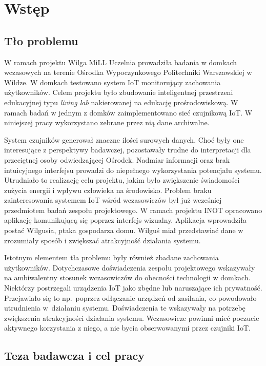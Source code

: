 \newpage
\section{Wstęp}

\subsection{Tło problemu}

W ramach projektu Wilga MiLL Uczelnia prowadziła badania w domkach wczasowych na terenie Ośrodka Wypoczynkowego Politechniki Warszawskiej w Wildze. W domkach testowano system IoT monitorujący zachowania użytkowników. Celem projektu było zbudowanie inteligentnej przestrzeni edukacyjnej typu \textit{living lab} nakierowanej na edukację prośrodowiskową. W ramach badań w jednym z domków zaimplementowano sieć czujnikową IoT. W niniejszej pracy wykorzystano zebrane przez nią dane archiwalne.

System czujników generował znaczne ilości surowych danych. Choć były one interesujące z perspektywy badawczej, pozostawały trudne do interpretacji dla przeciętnej osoby odwiedzającej Ośrodek. Nadmiar informacji oraz brak intuicyjnego interfejsu prowadzi do niepełnego wykorzystania potencjału systemu. Utrudniało to realizację celu projektu, jakim było zwiększenie świadomości zużycia energii i wpływu człowieka na środowisko. Problem braku zainteresowania systemem IoT wśród wczasowiczów był już wcześniej przedmiotem badań zespołu projektowego. W ramach projektu INOT opracowano aplikację komunikującą się poprzez interfejs wizualny. Aplikacja wprowadziła postać Wilgusia, ptaka gospodarza domu. Wilguś miał przedstawiać dane w zrozumiały sposób i zwiększać atrakcyjność działania systemu.

Istotnym elementem tła problemu były również zbadane zachowania użytkowników. Dotychczasowe doświadczenia zespołu projektowego wskazywały na ambiwalentny stosunek wczasowiczów do obecności technologii w domkach. Niektórzy postrzegali urządzenia IoT jako zbędne lub naruszające ich prywatność. Przejawiało się to np.\ poprzez odłączanie urządzeń od zasilania, co powodowało utrudnienia w~działaniu systemu. Doświadczenia te wskazywały na potrzebę zwiększenia atrakcyjności działania systemu. Wczasowicze powinni mieć poczucie aktywnego korzystania z niego, a nie bycia obserwowanymi przez czujniki IoT.

\subsection{Teza badawcza i cel pracy}

